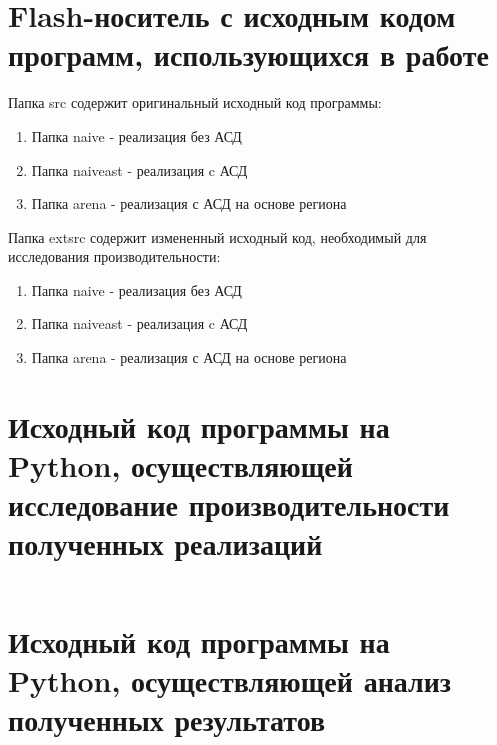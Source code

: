 \section{Flash-носитель с исходным кодом программ, использующихся в работе}
{\raggedright
Папка src содержит оригинальный исходный код программы:}

\begin{enumerate}
    \item[] Папка naive - реализация без АСД
    \item[] Папка naiveast - реализация c АСД
    \item[] Папка arena - реализация с АСД на основе 
    региона
\end{enumerate}

{\raggedright
Папка extsrc содержит измененный исходный код, необходимый для исследования производительности:}

\begin{enumerate}
    \item[] Папка naive - реализация без АСД
    \item[] Папка naiveast - реализация c АСД
    \item[] Папка arena - реализация с АСД на основе 
    региона
\end{enumerate}
\label{app:A}

\section{Исходный код программы на Python, осуществляющей исследование
производительности полученных реализаций}
\inputminted{python}{requirements/src/test.py}
\label{app:B}

\section{Исходный код программы на Python, осуществляющей анализ полученных 
результатов}
\inputminted{python}{requirements/src/graph.py}
\label{app:C}